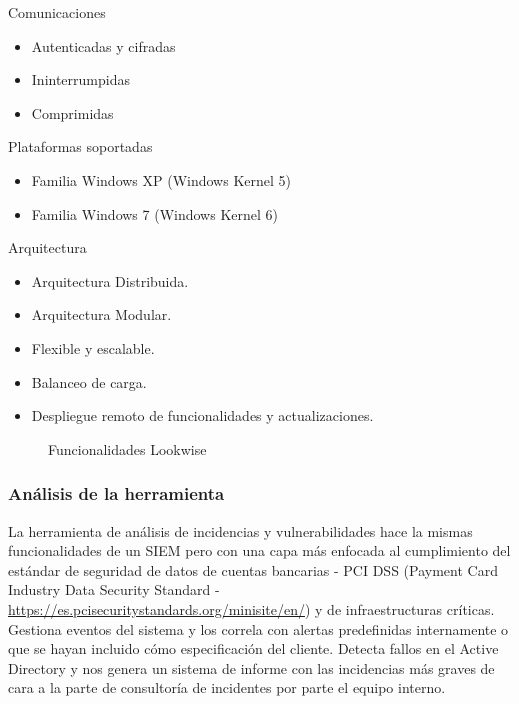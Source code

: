 Comunicaciones
\begin{itemize}
\item Autenticadas y cifradas
\item Ininterrumpidas
\item Comprimidas
\end{itemize}

Plataformas soportadas
\begin{itemize}
\item Familia Windows XP (Windows Kernel 5)
\item Familia Windows 7 (Windows Kernel 6)
\end{itemize}

Arquitectura
\begin{itemize}
\item Arquitectura Distribuida.
\item Arquitectura Modular.
\item Flexible y escalable.
\item Balanceo de carga.
\item Despliegue remoto de funcionalidades y actualizaciones.
\end{itemize}
\begin{figure}[H]
\caption{Funcionalidades Lookwise}
\end{figure}

\subsubsection{Análisis de la herramienta}

La herramienta de análisis de incidencias y vulnerabilidades hace la mismas funcionalidades de un SIEM pero con una capa más enfocada al cumplimiento del estándar de seguridad de datos de cuentas bancarias - PCI DSS (Payment Card Industry Data Security Standard - \url{https://es.pcisecuritystandards.org/minisite/en/}) y de infraestructuras críticas. Gestiona eventos del sistema y los correla con alertas predefinidas internamente o que se hayan incluido cómo especificación del cliente. Detecta fallos en el Active Directory y nos genera un sistema de informe con las incidencias más graves de cara a la parte de consultoría de incidentes por parte el equipo interno.


